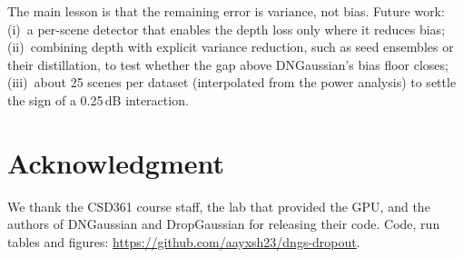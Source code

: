 \documentclass[conference]{IEEEtran}
\newcommand{\dB}{\,dB}
\begin{document}
The main lesson is that the remaining error is variance, not bias. Future work: (i)~a per-scene detector that enables the depth loss only where it reduces bias; (ii)~combining depth with explicit variance reduction, such as seed ensembles or their distillation, to test whether the gap above DNGaussian's bias floor closes; (iii)~about 25 scenes per dataset (interpolated from the power analysis) to settle the sign of a 0.25\dB{} interaction.

\section*{Acknowledgment}
We thank the CSD361 course staff, the lab that provided the GPU, and the authors of DNGaussian and DropGaussian for releasing their code. Code, run tables and figures: \url{https://github.com/aayxsh23/dngs-dropout}.



\end{document}
